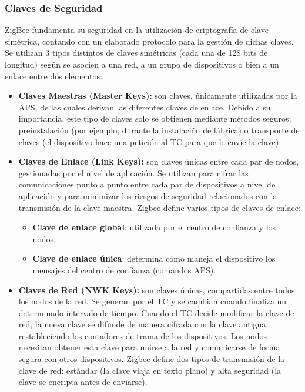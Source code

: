 \subsubsection{Claves de Seguridad} %
ZigBee fundamenta su seguridad en la utilización de criptografía de clave simétrica, contando con un elaborado protocolo para la gestión de dichas claves. Se utilizan 3 tipos distintos de claves simétricas (cada una de 128 bits de longitud) según se asocien a una red, a un grupo de dispositivos o bien a un enlace entre dos elementos:
\begin{itemize}
\item{\bf Claves Maestras (Master Keys):} son claves, únicamente utilizadas por la APS, de las cuales derivan las diferentes claves de enlace. Debido a su importancia, este tipo de claves solo se obtienen mediante métodos seguros: preinstalación (por ejemplo, durante la instalación de fábrica) o transporte de claves (el dispositivo hace una petición al TC para que le envíe la clave).
\item{\bf Claves de Enlace (Link Keys):} son claves únicas entre cada par de nodos, gestionadas por el nivel de aplicación. Se utilizan para cifrar las comunicaciones punto a punto entre cada par de dispositivos a nivel de aplicación y para minimizar los riesgos de seguridad relacionados con la transmisión de la clave maestra. Zigbee define varios tipos de claves de enlace:
	\begin{itemize}
	\item{\bf Clave de enlace global}: utilizada por el centro de confianza y los nodos.
	\item{\bf Clave de enlace única}: determina cómo maneja el dispositivo los mensajes del centro de confianza (comandos APS).
	\end{itemize}
\item{\bf Claves de Red (NWK Keys):} son claves únicas, compartidas entre todos los nodos de la red. Se generan por el TC y se cambian cuando finaliza un determinado intervalo de tiempo. Cuando el TC decide modificar la clave de red, la nueva clave se difunde de manera cifrada con la clave antigua, restableciendo los contadores de trama de los dispositivos. Los nodos necesitan obtener esta clave para unirse a la red y comunicarse de forma segura con otros dispositivos. Zigbee define dos tipos de transmisión de la clave de red: estándar (la clave viaja en texto plano) y alta seguridad (la clave se encripta antes de enviarse).
\end{itemize}
